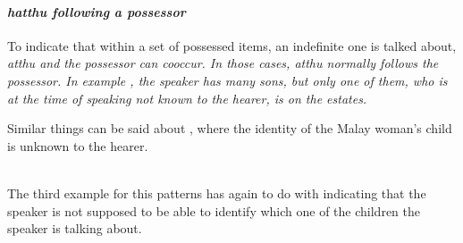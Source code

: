 \paragraph{\em hatthu \em following a possessor}

To indicate that within a set of possessed items, an indefinite one is talked about, \em atthu \em and the possessor can cooccur. In those cases, \em atthu \em normally follows the possessor. In example , the speaker has many sons, but only one of them, who is at the time of speaking not known to the hearer, is on the estates.


Similar things can be said about , where the identity of the Malay woman's child is unknown to the hearer.

\\

The third example for this patterns has again to do with indicating that the speaker is not supposed to be able to identify which one of the children the speaker is talking about.


%


